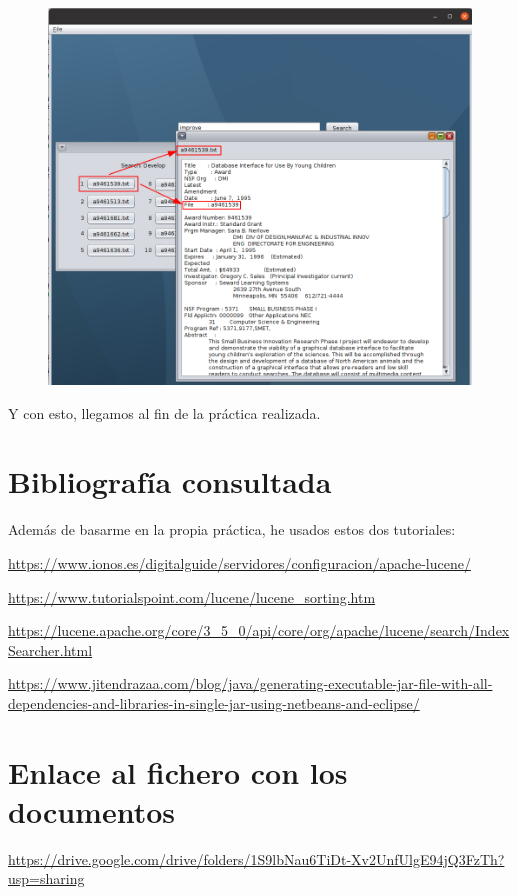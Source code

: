 \begin{figure}[H]
	\centering
	\includegraphics[width=0.7\linewidth]{Imagenes/screenshot008}
	\label{fig:screenshot008}
\end{figure}

Y con esto, llegamos al fin de la práctica realizada.

\section{Bibliografía consultada}
Además de basarme en la propia práctica, he usados estos dos tutoriales:

\url{https://www.ionos.es/digitalguide/servidores/configuracion/apache-lucene/}

\url{https://www.tutorialspoint.com/lucene/lucene_sorting.htm}

\url{https://lucene.apache.org/core/3_5_0/api/core/org/apache/lucene/search/IndexSearcher.html}

\url{https://www.jitendrazaa.com/blog/java/generating-executable-jar-file-with-all-dependencies-and-libraries-in-single-jar-using-netbeans-and-eclipse/}

\section{Enlace al fichero con los documentos}

\url{https://drive.google.com/drive/folders/1S9lbNau6TiDt-Xv2UnfUlgE94jQ3FzTh?usp=sharing}


